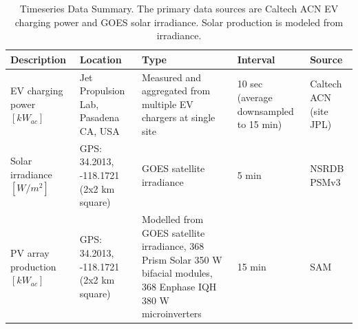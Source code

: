 \documentclass[journal,article,submit,pdftex,moreauthors]{Definitions/mdpi}
\begin{document}

\begin{table}[!h]
  \centering
  \caption{Timeseries Data Summary. The primary data sources are Caltech ACN EV charging power and GOES solar irradiance. Solar production is modeled from irradiance.}
  \label{tab:data-summary}
  \begin{tabularx}{\linewidth}{XXXXX}
    \toprule
    Description                     & Location                                & Type                                                                                                                  & Interval                               & Source                                \\
    \midrule
    EV charging power $[kW_{ac}]$   & Jet Propulsion Lab, Pasadena CA, USA    & Measured and aggregated from multiple  EV chargers at single site                                                     & 10 sec (average downsampled to 15 min) & Caltech ACN (site JPL) \cite{Lee2021} \\
    Solar irradiance $[W/m^2]$      & GPS: 34.2013, -118.1721 (2x2 km square) & GOES satellite irradiance                                                                                             & 5 min                                  & NSRDB PSMv3 \cite{Sengupta2018}       \\
    PV array production $[kW_{ac}]$ & GPS: 34.2013, -118.1721 (2x2 km square) & Modelled from GOES satellite irradiance, 368 Prism Solar 350 W bifacial modules, 368 Enphase IQH 380 W microinverters & 15 min                                 & SAM \cite{NREL2022}                   \\
    \bottomrule
  \end{tabularx}
\end{table}
\end{document}
